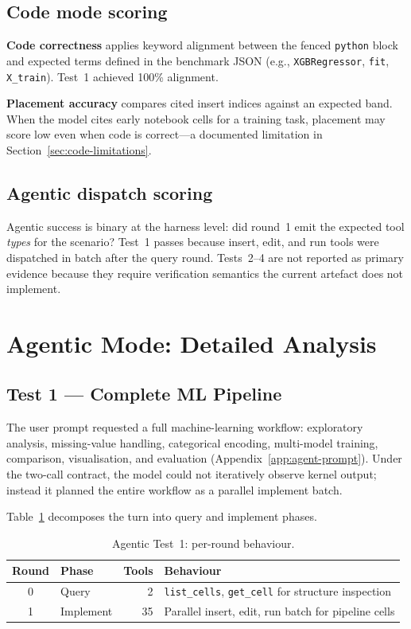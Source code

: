 \subsection{Code mode scoring}

\textbf{Code correctness} applies keyword alignment between the fenced \texttt{python} block and expected terms defined in the benchmark JSON (e.g., \texttt{XGBRegressor}, \texttt{fit}, \texttt{X\_train}). Test~1 achieved 100\% alignment.

\textbf{Placement accuracy} compares cited insert indices against an expected band. When the model cites early notebook cells for a training task, placement may score low even when code is correct---a documented limitation in Section~\ref{sec:code-limitations}.

\subsection{Agentic dispatch scoring}

Agentic success is binary at the harness level: did round~1 emit the expected tool \emph{types} for the scenario? Test~1 passes because insert, edit, and run tools were dispatched in batch after the query round. Tests~2--4 are not reported as primary evidence because they require verification semantics the current artefact does not implement.

\section{Agentic Mode: Detailed Analysis}
\label{sec:agentic-detail}

\subsection{Test 1 --- Complete ML Pipeline}

The user prompt requested a full machine-learning workflow: exploratory analysis, missing-value handling, categorical encoding, multi-model training, comparison, visualisation, and evaluation (Appendix~\ref{app:agent-prompt}). Under the two-call contract, the model could not iteratively observe kernel output; instead it planned the entire workflow as a parallel implement batch.

Table~\ref{tab:agentic-rounds} decomposes the turn into query and implement phases.

\begin{table}[!ht]
\centering
\caption{Agentic Test~1: per-round behaviour.}
\label{tab:agentic-rounds}
\small
\begin{tabular}{|c|p{3.2cm}|r|p{5.8cm}|}
\hline
\textbf{Round} & \textbf{Phase} & \textbf{Tools} & \textbf{Behaviour} \\ \hline
0 & Query & 2 & \texttt{list\_cells}, \texttt{get\_cell} for structure inspection \\ \hline
1 & Implement & 35 & Parallel insert, edit, run batch for pipeline cells \\ \hline
\end{tabular}
\end{table}

